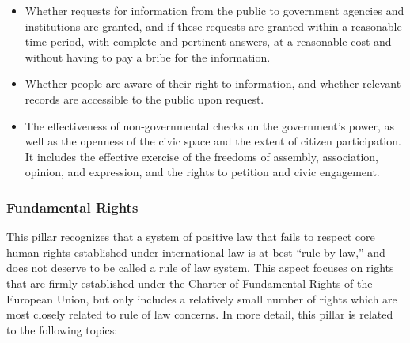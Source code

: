 \documentclass[
]{agujournal2019}
\providecommand{\tightlist}{%
  \setlength{\itemsep}{0pt}\setlength{\parskip}{0pt}}\usepackage{longtable,booktabs,array}
\begin{document}
\begin{itemize}
\tightlist
\item
  Whether requests for information from the public to government
  agencies and institutions are granted, and if these requests are
  granted within a reasonable time period, with complete and pertinent
  answers, at a reasonable cost and without having to pay a bribe for
  the information.
\item
  Whether people are aware of their right to information, and whether
  relevant records are accessible to the public upon request.
\item
  The effectiveness of non-governmental checks on the government's
  power, as well as the openness of the civic space and the extent of
  citizen participation. It includes the effective exercise of the
  freedoms of assembly, association, opinion, and expression, and the
  rights to petition and civic engagement.
\end{itemize}

\subsubsection{Fundamental Rights}\label{fundamental-rights}

This pillar recognizes that a system of positive law that fails to
respect core human rights established under international law is at best
``rule by law,'' and does not deserve to be called a rule of law system.
This aspect focuses on rights that are firmly established under the
Charter of Fundamental Rights of the European Union, but only includes a
relatively small number of rights which are most closely related to rule
of law concerns. In more detail, this pillar is related to the following
topics:
\end{document}
